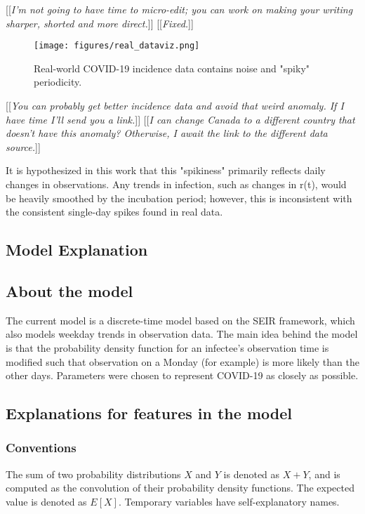 \documentclass{article}
\newcommand{\jd}[1]{[[\textsl{#1}]]} %
\newcommand{\msComment}[1]{[[\textsl{#1}]]}
\begin{document}
\jd{I'm not going to have time to micro-edit; you can work on making your writing sharper, shorted and more direct.} \msComment{Fixed.}

\clearpage
\begin{figure}[h!]
\centering
\texttt{[image: figures/real\_dataviz.png]}
\caption{Real-world COVID-19 incidence data contains noise and "spiky" periodicity. \cite{OWID}}
\end{figure}
\jd{You can probably get better incidence data and avoid that weird anomaly. If I have time I'll send you a link.} \msComment{I can change Canada to a different country that doesn't have this anomaly? Otherwise, I await the link to the different data source.}


It is hypothesized in this work that this "spikiness" primarily reflects daily changes in observations. Any trends in infection, such as changes in r(t), would be heavily smoothed by the incubation period; however, this is inconsistent with the consistent single-day spikes found in real data.

\subsection{Model Explanation}

\subsection{About the model}
The current model is a discrete-time model based on the SEIR framework, which also models weekday trends in observation data. The main idea behind the model is that the probability density function for an infectee's observation time is modified such that observation on a Monday (for example) is more likely than the other days. Parameters were chosen to represent COVID-19 as closely as possible.

\subsection{Explanations for features in the model}

\subsubsection{Conventions}
The sum of two probability distributions $X$ and $Y$ is denoted as $X+Y$, and is computed as the convolution of their probability density functions. The expected value is denoted as $E[X]$. Temporary variables have self-explanatory names.
\end{document}
